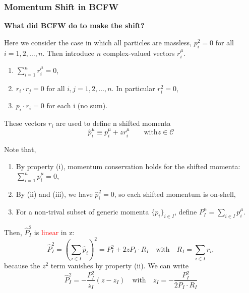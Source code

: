 \documentclass{beamer}
\begin{document}
\begin{frame}
    \frametitle{Momentum Shift in BCFW}
    \textbf{What did BCFW do to make the shift?}


    Here we consider the case in which all particles are massless, $p_i^2 = 0$ for all $i = 1, 2, \dotsc, n$. Then introduce $n$ complex-valued vectors $r_i^\mu$.
    \begin{enumerate}[label=(\roman*)]
        \item $\sum_{i=1}^n r_i^\mu=0$,
        \item $r_i\cdot r_j = 0$ for all $i,j=1, 2, \ldots, n.$ In particular $r_i^2=0$,
        \item $p_i \cdot r_i =0$ for each i (no sum). 
    \end{enumerate}

These vectors $r_i$ are used to define n shifted momenta
\begin{equation*}
    \hat{p}_i^\mu \equiv p_i^\mu + zr_i^\mu \qquad \text{with} z \in \mathcal{C}
\end{equation*}

\end{frame}
\begin{frame}
Note that,
    \begin{enumerate}[label=(\Alph*)]
    \item By property (i), momentum conservation holds for the shifted momenta: $\sum_{i=1}^{n} \hat{p}_i^\mu =0$,
    \item By (ii) and (iii), we have $\hat{p}_i^2=0$, so each shifted momentum is on-shell,
    \item For a non-trival subset of generic momenta $\{p_i\}_{i\in I}$, define $P_I^\mu=\sum_{i\in I}p_i^\mu$.
    \end{enumerate}
Then, $\hat{P}_I^2$ is \textcolor{red}{linear} in z:
\begin{equation*}
    \hat{P}_I^2=\left(\sum_{i\in I} \hat{p}_i \right) ^2 = P_I^2 +2zP_I\cdot R_I \quad \text{with} \quad R_I=\sum_{i\in I} r_i ,
\end{equation*}
because the $z^2$ term vanishes by property (ii). We can write 
\begin{equation*}
    \hat{P}_I^2 = -\frac{P_I^2}{z_I}(z-z_I) \quad \text{with} \quad z_I=-\frac{P_I^2}{2P_I\cdot R_I}
\end{equation*}
\end{frame}
\end{document}
